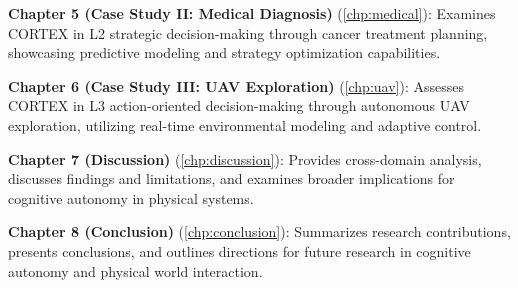 \textbf{Chapter 5 (Case Study II: Medical Diagnosis)} (\autoref{chp:medical}): Examines CORTEX in L2 strategic decision-making through cancer treatment planning, showcasing predictive modeling and strategy optimization capabilities.

\textbf{Chapter 6 (Case Study III: UAV Exploration)} (\autoref{chp:uav}): Assesses CORTEX in L3 action-oriented decision-making through autonomous UAV exploration, utilizing real-time environmental modeling and adaptive control.

\textbf{Chapter 7 (Discussion)} (\autoref{chp:discussion}): Provides cross-domain analysis, discusses findings and limitations, and examines broader implications for cognitive autonomy in physical systems.

\textbf{Chapter 8 (Conclusion)} (\autoref{chp:conclusion}): Summarizes research contributions, presents conclusions, and outlines directions for future research in cognitive autonomy and physical world interaction.

